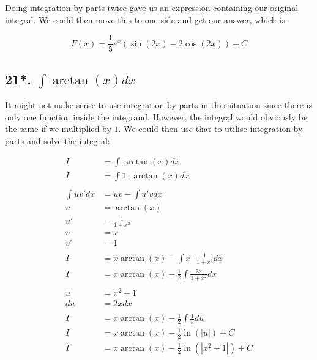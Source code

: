 \documentclass[12pt]{article}
\begin{document}
Doing integration by parts twice gave us an expression containing our original integral.
We could then move this to one side and get our answer, which is:

$$
    F(x) = \frac{1}{5}e^x(\sin(2x) - 2\cos(2x)) + C
$$

\subsection*{21*. $\int \arctan(x) dx$}

It might not make sense to use integration by parts in this situation since there is only one function inside the integrand.
However, the integral would obviously be the same if we multiplied by $1$.
We could then use that to utilise integration by parts and solve the integral:


\begin{align}
    I           & = \int \arctan(x) dx                                 \\
    I           & = \int 1 \cdot \arctan(x) dx                         \\
    \nonumber                                                          \\
    \int uv' dx & = uv - \int u'v dx                                   \\
    u           & = \arctan(x)                                         \\
    u'          & = \frac{1}{1+x^2}                                    \\
    v           & = x                                                  \\
    v'          & = 1                                                  \\
    \nonumber                                                          \\
    I           & = x\arctan(x) - \int x \cdot \frac{1}{1+x^2} dx      \\
    I           & = x\arctan(x) - \frac{1}{2} \int \frac{2x}{1+x^2} dx \\
    \nonumber                                                          \\
    u           & = x^2 + 1                                            \\
    du          & = 2x dx                                              \\
    \nonumber                                                          \\
    I           & = x\arctan(x) - \frac{1}{2} \int \frac{1}{u} du      \\
    I           & = x\arctan(x) - \frac{1}{2} \ln(|u|) + C             \\
    I           & = x\arctan(x) - \frac{1}{2} \ln(|x^2 + 1|) + C
\end{align}
\end{document}
